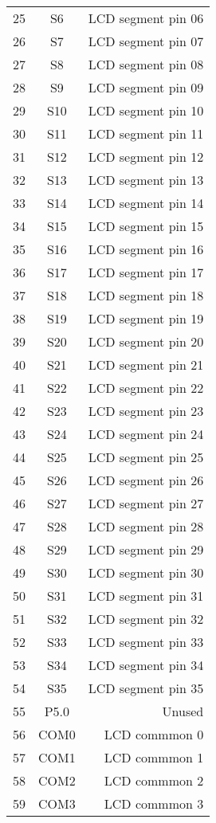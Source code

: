 {\begin{longtable}[c]{|l|c|r|}
  25 & S6 & LCD segment pin 06 \\
  26 & S7 & LCD segment pin 07 \\
  27 & S8 & LCD segment pin 08 \\
  28 & S9 & LCD segment pin 09 \\
  29 & S10 & LCD segment pin 10 \\
  30 & S11 & LCD segment pin 11 \\ \hline
  31 & S12 & LCD segment pin 12 \\
  32 & S13 & LCD segment pin 13 \\
  33 & S14 & LCD segment pin 14 \\
  34 & S15 & LCD segment pin 15 \\
  35 & S16 & LCD segment pin 16 \\
  36 & S17 & LCD segment pin 17 \\
  37 & S18 & LCD segment pin 18 \\
  38 & S19 & LCD segment pin 19 \\
  39 & S20 & LCD segment pin 20 \\
  40 & S21 & LCD segment pin 21 \\ \hline
  41 & S22 & LCD segment pin 22 \\
  42 & S23 & LCD segment pin 23 \\
  43 & S24 & LCD segment pin 24 \\
  44 & S25 & LCD segment pin 25 \\
  45 & S26 & LCD segment pin 26 \\
  46 & S27 & LCD segment pin 27 \\
  47 & S28 & LCD segment pin 28 \\
  48 & S29 & LCD segment pin 29 \\
  49 & S30 & LCD segment pin 30 \\
  50 & S31 & LCD segment pin 31 \\
  51 & S32 & LCD segment pin 32 \\
  52 & S33 & LCD segment pin 33 \\
  53 & S34 & LCD segment pin 34 \\
  54 & S35 & LCD segment pin 35 \\
  55 & P5.0 & Unused \\
  56 & COM0 & LCD commmon 0 \\
  57 & COM1 & LCD commmon 1 \\
  58 & COM2 & LCD commmon 2 \\
  59 & COM3 & LCD commmon 3 \\

\end{longtable}}
